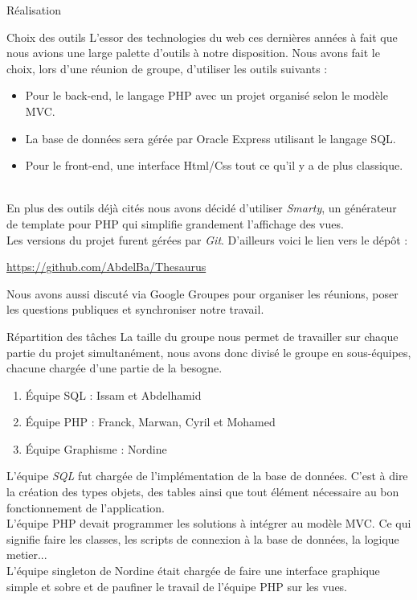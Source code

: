 \documentclass[a4paper, 12pt]{report}
\begin{document}
\begin{chapter}{Réalisation}
	\begin{section}{Choix des outils}
	L'essor des technologies du web ces dernières années à fait que nous avions une large palette d'outils à notre disposition. Nous avons fait le choix,
	lors d'une réunion de groupe, d'utiliser les outils suivants :
	\begin{itemize}
		\item Pour le back-end, le langage PHP avec un projet organisé selon le modèle MVC.
		\item La base de données sera gérée par Oracle Express utilisant le langage SQL.
		\item Pour le front-end, une interface Html/Css tout ce qu'il y a de plus classique.
	\end{itemize}~\\

	En plus des outils déjà cités nous avons décidé d'utiliser \emph{Smarty}, un générateur de template pour PHP qui simplifie grandement l'affichage des vues.\\
	Les versions du projet furent gérées par \emph{Git}. D'ailleurs voici le lien vers le dépôt :

	\begin{center} \url{https://github.com/AbdelBa/Thesaurus}\end{center}

	Nous avons aussi discuté via Google Groupes pour organiser les réunions, poser les questions publiques et synchroniser notre travail.
	\end{section}

	\begin{section}{Répartition des tâches}
		La taille du groupe nous permet de travailler sur chaque partie du projet simultanément, nous avons donc divisé le groupe en sous-équipes,
		chacune chargée d'une partie de la besogne.
		\begin{enumerate}
			\item{Équipe SQL} : Issam et Abdelhamid
			\item{Équipe PHP} : Franck, Marwan, Cyril et Mohamed
			\item{Équipe Graphisme} : Nordine
		\end{enumerate}

		L'équipe \emph{SQL} fut chargée de l'implémentation de la base de données. C'est à dire la création des types objets, des tables ainsi 
		que tout élément nécessaire au bon fonctionnement de l'application.\\
		L'équipe PHP devait programmer les solutions à intégrer au modèle MVC. Ce qui signifie faire les classes, les scripts de connexion à la 
		base de données, la logique metier...\\
		L'équipe singleton de Nordine était chargée de faire une interface graphique simple et sobre et de paufiner le travail de l'équipe PHP
		sur les vues.
	\end{section}


\end{chapter}
\end{document}
